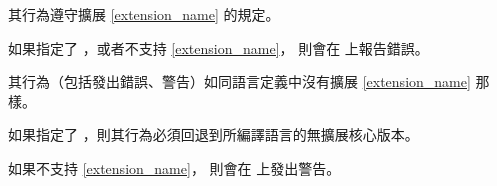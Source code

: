 \startbuffer[enExtDsc]
其行為遵守擴展 \cref{extension_name} 的規定。

如果指定了 ，或者不支持 \cref{extension_name}，
則會在  上報告錯誤。
\stopbuffer

\startbuffer[disExtDsc]
其行為（包括發出錯誤、警告）如同語言定義中沒有擴展 \cref{extension_name} 那樣。

如果指定了 ，則其行為必須回退到所編譯語言的無擴展核心版本。

如果不支持 \cref{extension_name}，
則會在  上發出警告。
\stopbuffer

\startCLOD[behavior][描述]
\stopCLOD
